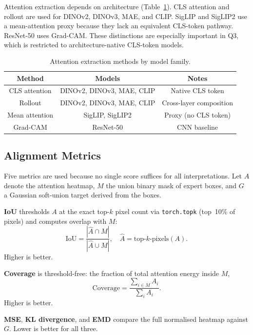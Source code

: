 \documentclass[lineno,pdflatex,sn-mathphys-num]{sn-jnl}%
\theoremstyle{thmstyleone}%
\theoremstyle{thmstyletwo}%
\theoremstyle{thmstylethree}%
\begin{document}
Attention extraction depends on architecture (Table~\ref{tab:extraction}). CLS
attention and rollout are used for DINOv2, DINOv3, MAE, and CLIP. SigLIP and
SigLIP2 use a mean-attention proxy because they lack an equivalent CLS-token
pathway. ResNet-50 uses Grad-CAM. These distinctions are especially important
in Q3, which is restricted to architecture-native CLS-token models.

\begin{table}[h]
\centering
\caption{Attention extraction methods by model family.}
\label{tab:extraction}
{\begin{tabular}{ccc}
\toprule
Method & Models & Notes \\
\midrule
CLS attention & DINOv2, DINOv3, MAE, CLIP & Native CLS token \\
Rollout & DINOv2, DINOv3, MAE, CLIP & Cross-layer composition \\
Mean attention & SigLIP, SigLIP2 & Proxy (no CLS token) \\
Grad-CAM & ResNet-50 & CNN baseline \\
\bottomrule
\end{tabular}%
}
\end{table}

\subsection{Alignment Metrics}

Five metrics are used because no single score suffices for all interpretations.
Let $A$ denote the attention heatmap, $M$ the union binary mask of expert boxes,
and $G$ a Gaussian soft-union target derived from the boxes.

\textbf{IoU} thresholds $A$ at the exact top-$k$ pixel count via
\texttt{torch.topk} (top~10\% of pixels) and computes overlap with $M$:
\begin{equation}
  \text{IoU} = \frac{|\hat{A} \cap M|}{|\hat{A} \cup M|}, \quad
  \hat{A} = \text{top-}k\text{-pixels}(A).
\end{equation}
Higher is better.

\textbf{Coverage} is threshold-free: the fraction of total attention energy
inside $M$,
\begin{equation}
  \text{Coverage} = \frac{\sum_{i \in M} A_i}{\sum_i A_i}.
\end{equation}
Higher is better.

\textbf{MSE}, \textbf{KL divergence}, and \textbf{EMD} compare the full
normalised heatmap against $G$. Lower is better for all three.
\end{document}
